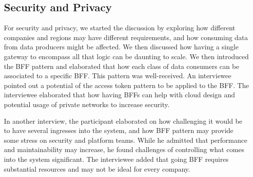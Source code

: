 \documentclass[a4paper,11pt,article,oneside]{memoir}
\begin{document}
\subsection{Security and Privacy}

For security and privacy, we started the discussion by exploring how different companies and regions may have different requirements, and how consuming data from data producers might be affected. We then discussed how having a single gateway to encompass all that logic can be daunting to scale. We then introduced the BFF pattern and elaborated that how each class of data consumers can be associated to a specific BFF. This pattern was well-received. An interviewee pointed out a potential of the access token pattern to be applied to the BFF. The interviewee elaborated that how having BFFs can help with cloud design and potential usage of private networks to increase security. 


In another interview, the participant elaborated on how challenging it would be to have several ingresses into the system, and how BFF pattern may provide some stress on security and platform teams. While he admitted that performance and maintainability may increase, he found challenges of controlling what comes into the system significant. The interviewee added that going BFF requires substantial resources and may not be ideal for every company.

\end{document}
